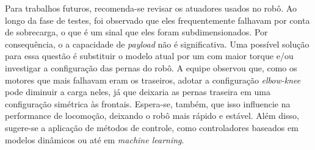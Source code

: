 \documentclass[../main.tex]{subfiles}
\begin{document}
Para trabalhos futuros, recomenda-se revisar os atuadores usados no robô. Ao longo da fase de testes, foi observado que eles frequentemente falhavam por conta de sobrecarga, o que é um sinal que eles foram subdimensionados. Por consequência, o a capacidade de \textit{payload} não é significativa. Uma possível solução para essa questão é substituir o modelo atual por um com maior torque e/ou investigar a configuração das pernas do robô. A equipe observou que, como os motores que mais falhavam eram os traseiros, adotar a configuração \textit{elbow-knee} pode diminuir a carga neles, já que deixaria as pernas traseira em uma configuração simétrica às frontais. Espera-se, também, que isso influencie na performance de locomoção, deixando o robô mais rápido e estável. Além disso, sugere-se a aplicação de métodos de controle, como controladores baseados em modelos dinâmicos ou até em \textit{machine learning}.
\end{document}
